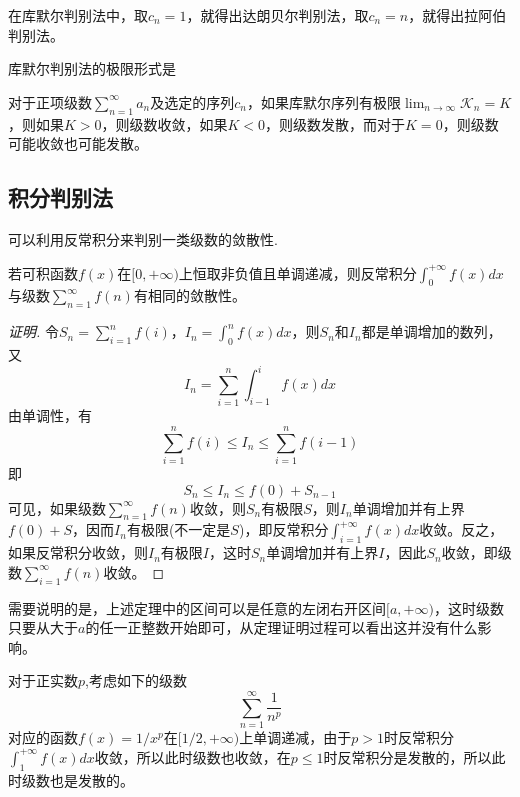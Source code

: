 在库默尔判别法中，取$c_n=1$，就得出达朗贝尔判别法，取$c_n=n$，就得出拉阿伯判别法。

库默尔判别法的极限形式是
\begin{theorem}
  对于正项级数$\sum_{n=1}^{\infty}a_n$及选定的序列$c_n$，如果库默尔序列有极限$\lim_{n \to \infty} \mathcal{K}_n=K$，则如果$K>0$，则级数收敛，如果$K<0$，则级数发散，而对于$K=0$，则级数可能收敛也可能发散。
\end{theorem}

\subsection{积分判别法}
\label{sec:the-integrate-method-of-determination-number-series}

可以利用反常积分来判别一类级数的敛散性.
\begin{theorem}[积分判别法]
  若可积函数$f(x)$在$[0,+\infty)$上恒取非负值且单调递减，则反常积分$\int_0^{+\infty}f(x)dx$与级数$\sum_{n=1}^{\infty}f(n)$有相同的敛散性。
\end{theorem}

\begin{proof}[证明]
  令$S_n=\sum_{i=1}^nf(i)$，$I_n=\int_0^nf(x)dx$，则$S_n$和$I_n$都是单调增加的数列，又
  \[ I_n=\sum_{i=1}^n\int_{i-1}^if(x)dx \]
  由单调性，有
  \[ \sum_{i=1}^nf(i) \leqslant I_n \leqslant \sum_{i=1}^nf(i-1) \]
  即
  \[ S_n \leqslant I_n \leqslant f(0)+S_{n-1} \]
  可见，如果级数$\sum_{n=1}^{\infty}f(n)$收敛，则$S_n$有极限$S$，则$I_n$单调增加并有上界$f(0)+S$，因而$I_n$有极限(不一定是$S$)，即反常积分$\int_{i=1}^{+\infty}f(x)dx$收敛。反之，如果反常积分收敛，则$I_n$有极限$I$，这时$S_n$单调增加并有上界$I$，因此$S_n$收敛，即级数$\sum_{i=1}^{\infty}f(n)$收敛。
\end{proof}

需要说明的是，上述定理中的区间可以是任意的左闭右开区间$[a,+\infty)$，这时级数只要从大于$a$的任一正整数开始即可，从定理证明过程可以看出这并没有什么影响。

\begin{example}
  对于正实数$p$,考虑如下的级数
  \[ \sum_{n=1}^{\infty}\frac{1}{n^p} \]
  对应的函数$f(x)=1/x^p$在$[1/2,+\infty)$上单调递减，由于$p>1$时反常积分$\int_1^{+\infty}f(x)dx$收敛，所以此时级数也收敛，在$p \leqslant 1$时反常积分是发散的，所以此时级数也是发散的。
\end{example}



